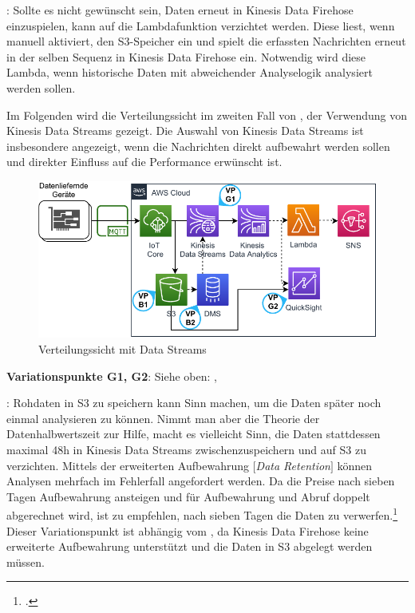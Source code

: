 : Sollte es nicht gewünscht sein, Daten erneut in Kinesis Data Firehose einzuspielen, kann auf die Lambdafunktion verzichtet werden. Diese liest, wenn manuell aktiviert, den \ac{S3}-Speicher ein und spielt die erfassten Nachrichten erneut in der selben Sequenz in Kinesis Data Firehose ein. Notwendig wird diese Lambda, wenn historische Daten mit abweichender Analyselogik analysiert werden sollen.

Im Folgenden wird die Verteilungssicht im zweiten Fall von , der Verwendung von Kinesis Data Streams gezeigt. Die Auswahl von Kinesis Data Streams ist insbesondere angezeigt, wenn die Nachrichten direkt aufbewahrt werden sollen und direkter Einfluss auf die Performance erwünscht ist.

\begin{figure}[H]
\centering
\includegraphics[width=\textwidth]{graphics/Echtzeit-RA-Overview.pdf}
\caption{Verteilungssicht mit Data Streams}
\label{abb:TopLevelEchtzeitRAStreams}
\end{figure}

\textbf{Variationspunkte G1, G2}: Siehe oben: , 

: Rohdaten in \ac{S3} zu speichern kann Sinn machen, um die Daten später noch einmal analysieren zu können. Nimmt man aber die Theorie der Datenhalbwertszeit zur Hilfe, macht es vielleicht Sinn, die Daten stattdessen maximal 48h in Kinesis Data Streams zwischenzuspeichern und auf \ac{S3} zu verzichten. Mittels der erweiterten Aufbewahrung $\lbrack$\textit{Data Retention}$\rbrack$ können Analysen mehrfach im Fehlerfall angefordert werden. Da die Preise nach sieben Tagen Aufbewahrung ansteigen und für Aufbewahrung und Abruf doppelt abgerechnet wird, ist zu empfehlen, nach sieben Tagen die Daten zu verwerfen.\footcite[Vgl.][]{AmazonWebServicesInc..o.J.l} Dieser Variationspunkt ist abhängig vom , da Kinesis Data Firehose keine erweiterte Aufbewahrung unterstützt und die Daten in \ac{S3} abgelegt werden müssen.

